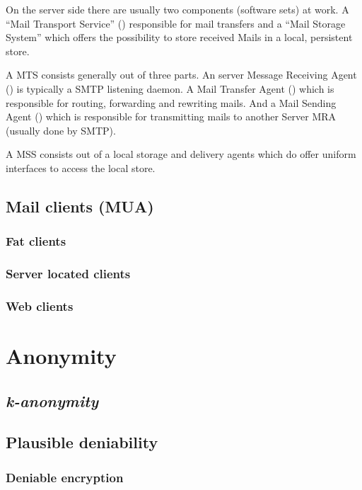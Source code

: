 On the server side there are usually two components (software sets) at work. A ``Mail Transport Service'' () responsible for mail transfers and a "`Mail Storage System"' which offers the possibility to store received Mails in a local, persistent store.\par

A MTS consists generally out of three parts. An server Message Receiving Agent () is typically a SMTP listening daemon. A Mail Transfer Agent () which is responsible for routing, forwarding and rewriting mails. And a Mail Sending Agent () which is responsible for transmitting mails to another Server MRA (usually done by SMTP).\par

A MSS consists out of a local storage and delivery agents which do offer uniform interfaces to access the local store.\par

\subsection{Mail clients (MUA)}
\subsubsection{Fat clients}
\subsubsection{Server located clients}
\subsubsection{Web clients}

\section{Anonymity}
\subsection{\itshape{k}-anonymity}
\cite{k-anonymous:ccs2003}
\cite{wpes10-unraveling}
\subsection{Plausible deniability}
\subsubsection{Deniable encryption}
